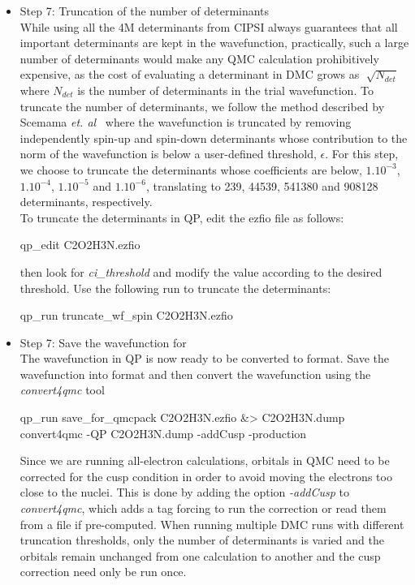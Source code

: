 \begin{itemize}
\item Step 7: Truncation of the number of determinants\\
While using all the 4M determinants from CIPSI always guarantees that all important determinants are kept in the wavefunction, practically, such a large number of determinants would make any QMC calculation prohibitively expensive, as the cost of evaluating a determinant in DMC grows as $\sqrt[]{N_{det}}$ where $N_{det}$ is the number of determinants in the trial wavefunction. To truncate the number of determinants, we follow the method described by Scemama \textit{et. al}~\cite{Scemama2018} where the wavefunction is truncated by removing independently spin-up and spin-down determinants whose contribution to the norm of the wavefunction is below a user-defined threshold, $\epsilon$. For this step, we choose to truncate the determinants whose coefficients are below, $1.10^{-3}$, $1.10^{-4}$, $1.10^{-5}$ and $1.10^{-6}$, translating to 239, 44539, 541380 and 908128 determinants, respectively.\\ 
To truncate the determinants in QP, edit the ezfio file as follows:\\
\begin{shade}
qp_edit C2O2H3N.ezfio  
\end{shade}

then look for \textit{ci\_threshold} and modify the value according to the desired threshold. Use the following run to truncate the determinants:\\

\begin{shade}
qp_run truncate_wf_spin C2O2H3N.ezfio  
\end{shade}

\item Step 7: Save the wavefunction for \qmcpack \\
The wavefunction in QP is now ready to be converted to \qmcpack format.
Save the wavefunction into \qmcpack format and then convert the wavefunction using the \textit{convert4qmc} tool\\

\begin{shade}
qp_run save_for_qmcpack C2O2H3N.ezfio &> C2O2H3N.dump  
convert4qmc -QP C2O2H3N.dump -addCusp -production
\end{shade}

Since we are running all-electron calculations, orbitals in QMC need to be corrected for the cusp condition in order to avoid moving the electrons too close to the nuclei.
This is done by adding the option \textit{-addCusp} to \textit{convert4qmc}, which adds a tag forcing \qmcpack to run the correction or read them from a file if pre-computed. When running multiple DMC runs with different truncation thresholds, only the number of determinants is varied and the orbitals remain unchanged from one calculation to another and the cusp correction need only be run once.


\end{itemize}
